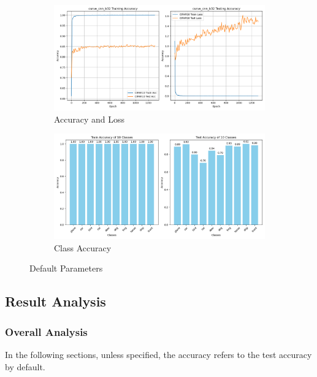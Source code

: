 \documentclass{article}
\begin{document}
\begin{figure}[!htp]
  \centering
  \begin{subfigure}[b]{1\textwidth}
    \includegraphics[width=\textwidth]{img/Part2/curve_cnn_default.png}
    \caption{Accuracy and Loss}
  \end{subfigure}
  \begin{subfigure}[b]{1\textwidth}
    \includegraphics[width=\textwidth]{img/Part2/acc_cnn_class_default.png}
    \caption{Class Accuracy}
  \end{subfigure}
  \caption{Default Parameters}
  \label{fig:p2_default}
\end{figure}

\subsection{Result Analysis}

\subsubsection{Overall Analysis}

In the following sections, unless specified, the accuracy refers to the test accuracy by default.
\end{document}
